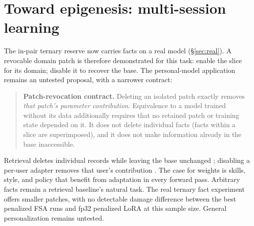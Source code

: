 \documentclass[11pt]{article}
\begin{document}
\section{Toward epigenesis: multi-session learning}
\label{sec:direction}
The in-pair ternary reserve now carries facts on a real model (\S\ref{sec:real}). A revocable domain patch
is therefore demonstrated for this task: enable the slice for its domain; disable it to recover the base.
The personal-model application remains an untested proposal, with a narrower contract:
\par

\begin{quote}\small
\textbf{Patch-revocation contract.} Deleting an isolated patch exactly removes \emph{that patch's parameter
contribution}. Equivalence to a model trained without its data additionally requires that no retained patch
or training state depended on it. It does not delete individual facts (facts within a slice are
superimposed), and it does not make information already in the base inaccessible.
\end{quote}

Retrieval deletes individual records while leaving the base unchanged \citep{rag,knnlm}; disabling a
per-user adapter removes that user's contribution \citep{oppu}. The case for weights is skills, style,
and policy that benefit from adaptation in every forward pass. Arbitrary facts remain a retrieval
baseline's natural task. The real ternary fact experiment offers smaller patches, with no detectable damage difference
between the best penalized FSA runs and fp32 penalized LoRA at this sample size.
General personalization remains untested.
\end{document}
